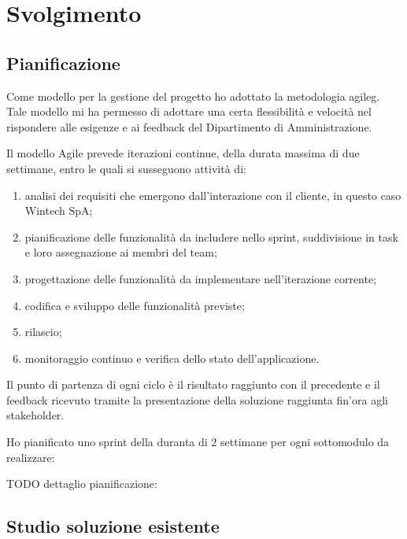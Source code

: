 
\chapter{Svolgimento}
\label{cap:svolgimento}


\section{Pianificazione}
	Come modello per la gestione del progetto ho adottato la metodologia \gls{agileg}. Tale
	modello mi ha permesso di adottare una certa flessibilità e velocità nel rispondere alle
	esigenze e ai feedback del Dipartimento di Amministrazione.
	
	Il modello Agile prevede iterazioni continue, della durata massima di due settimane,
	entro le quali si susseguono attività di:
	\begin{enumerate}
		\item analisi dei requisiti che emergono dall’interazione con il cliente, in questo caso Wintech SpA;
		\item pianificazione delle funzionalità da includere nello sprint, suddivisione in task e loro assegnazione ai membri del team;
		\item progettazione delle funzionalità da implementare nell’iterazione corrente;
		\item codifica e sviluppo delle funzionalità previste;
		\item rilascio;
		\item monitoraggio continuo e verifica dello stato dell’applicazione.
	\end{enumerate}
		
	Il punto di partenza di ogni ciclo è il risultato raggiunto con il precedente e il feedback
	ricevuto tramite la presentazione della soluzione raggiunta fin’ora agli stakeholder.
	
	Ho pianificato uno sprint della duranta di 2 settimane per ogni sottomodulo da realizzare:

	TODO dettaglio pianificazione:
			

\section{Studio soluzione esistente}
	

